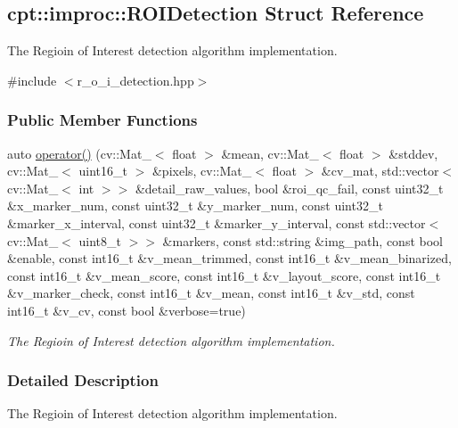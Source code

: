 \hypertarget{structcpt_1_1improc_1_1_r_o_i_detection}{\subsection{cpt\-:\-:improc\-:\-:R\-O\-I\-Detection Struct Reference}
\label{structcpt_1_1improc_1_1_r_o_i_detection}
}


The Regioin of Interest detection algorithm implementation.  




{\ttfamily \#include $<$r\-\_\-o\-\_\-i\-\_\-detection.\-hpp$>$}

\subsubsection*{Public Member Functions}
\begin{DoxyCompactItemize}
\item 
auto \hyperlink{structcpt_1_1improc_1_1_r_o_i_detection_a0d8b48ec6fc2e30969aee0559cb2d645}{operator()} (cv\-::\-Mat\-\_\-$<$ float $>$ \&mean, cv\-::\-Mat\-\_\-$<$ float $>$ \&stddev, cv\-::\-Mat\-\_\-$<$ uint16\-\_\-t $>$ \&pixels, cv\-::\-Mat\-\_\-$<$ float $>$ \&cv\-\_\-mat, std\-::vector$<$ cv\-::\-Mat\-\_\-$<$ int $>$$>$ \&detail\-\_\-raw\-\_\-values, bool \&roi\-\_\-qc\-\_\-fail, const uint32\-\_\-t \&x\-\_\-marker\-\_\-num, const uint32\-\_\-t \&y\-\_\-marker\-\_\-num, const uint32\-\_\-t \&marker\-\_\-x\-\_\-interval, const uint32\-\_\-t \&marker\-\_\-y\-\_\-interval, const std\-::vector$<$ cv\-::\-Mat\-\_\-$<$ uint8\-\_\-t $>$$>$ \&markers, const std\-::string \&img\-\_\-path, const bool \&enable, const int16\-\_\-t \&v\-\_\-mean\-\_\-trimmed, const int16\-\_\-t \&v\-\_\-mean\-\_\-binarized, const int16\-\_\-t \&v\-\_\-mean\-\_\-score, const int16\-\_\-t \&v\-\_\-layout\-\_\-score, const int16\-\_\-t \&v\-\_\-marker\-\_\-check, const int16\-\_\-t \&v\-\_\-mean, const int16\-\_\-t \&v\-\_\-std, const int16\-\_\-t \&v\-\_\-cv, const bool \&verbose=true)
\begin{DoxyCompactList}\small\item\em The Regioin of Interest detection algorithm implementation. \end{DoxyCompactList}\end{DoxyCompactItemize}


\subsubsection{Detailed Description}
The Regioin of Interest detection algorithm implementation. 

